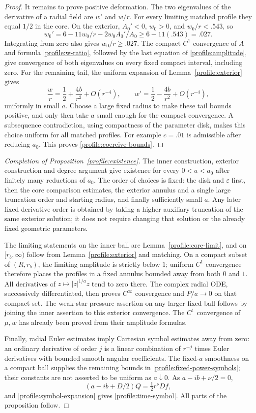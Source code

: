\documentclass[11pt]{article}
\numberwithin{equation}{section}
\theoremstyle{definition}
\theoremstyle{remark}
\begin{document}
\begin{proof}
It remains to prove positive deformation.  The two eigenvalues of the
derivative of a radial field are $w'$ and $w/r$.  For every limiting
matched profile they equal $1/2$ in the core.  On the exterior,
$A_0'<0$, $w_0>0$, and $w_0/r<.543$, so
\[
 w_0'=6-11w_0/r-2w_0A_0'/A_0\ge6-11(.543)=.027.
\]
Integrating from zero also gives $w_0/r\ge.027$.  The compact $C^1$
convergence of $A$ and formula \eqref{profile:w-ratio}, followed by
the last equation of \eqref{profile:amplitude}, give convergence of
both eigenvalues on every fixed compact interval, including zero.
For the remaining tail, the uniform expansion of Lemma~\ref{profile:exterior}
gives
\[
 \frac wr=\frac12+\frac{4b}{r^2}+O(r^{-4}),\qquad
 w'=\frac12-\frac{4b}{r^2}+O(r^{-4}),
\]
uniformly in small $a$.  Choose a large fixed radius to make these tail
bounds positive, and only then take $a$ small enough for the compact
convergence.  A subsequence contradiction, using compactness of the
parameter disk, makes this choice uniform for all matched profiles.
For example $c=.01$ is admissible after reducing $a_0$.  This proves
\eqref{profile:coercive-bounds}.
\end{proof}

\begin{proof}[Completion of Proposition~\ref{profile:existence}]
The inner construction, exterior construction and degree argument give
existence for every $0<a<a_0$ after finitely many reductions of $a_0$.
The order of choices is fixed: the disk and $\varepsilon$ first, then
the core comparison estimates, the exterior annulus and a single large
truncation order and starting radius, and finally sufficiently small
$a$.  Any later fixed derivative order is obtained by taking a higher
auxiliary truncation of the same exterior solution; it does not require
changing that solution or the already fixed geometric parameters.

The limiting statements on the inner ball are
Lemma~\ref{profile:core-limit}, and on $[r_b,\infty)$ follow from
Lemma~\ref{profile:exterior} and matching.  On a compact subset of
$(R,r_b)$, the limiting amplitude is strictly below $1$; uniform
$C^1$ convergence therefore places the profiles in a fixed annulus
bounded away from both $0$ and $1$.  All derivatives of
$z\mapsto|z|^{1/a}z$ tend to zero there.  The complex radial ODE,
successively differentiated, then proves $C^\infty$ convergence and
$P/a\to0$ on that compact set.  The weak-star pressure assertion on
any larger fixed ball follows by joining the inner assertion to this
exterior convergence.  The $C^1$ convergence of $\mu,w$ has already
been proved from their amplitude formulas.

Finally, radial Euler estimates imply Cartesian symbol estimates away
from zero: an ordinary derivative of order $j$ is a linear combination
of $r^{-j}$ times Euler derivatives with bounded smooth angular
coefficients.  The fixed-$a$ smoothness on a compact ball supplies the
remaining bounds in \eqref{profile:fixed-power-symbols}; their constants
are not asserted to be uniform as $a\downarrow0$.  As
$a-ib+\nu/2=0$,
\[
 (a-ib+D/2)Q=\tfrac12r^\nu Df,
\]
and \eqref{profile:symbol-expansion} gives
\eqref{profile:time-symbol}.  All parts of the proposition follow.
\end{proof}
\end{document}
